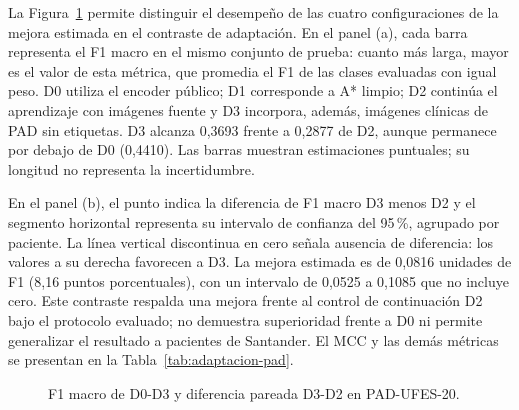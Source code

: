 La Figura~\ref{fig:adaptacion-pad-d0-d3} permite distinguir el desempeño de las cuatro configuraciones de la mejora estimada en el contraste de adaptación. En el panel (a), cada barra representa el F1 macro en el mismo conjunto de prueba: cuanto más larga, mayor es el valor de esta métrica, que promedia el F1 de las clases evaluadas con igual peso. D0 utiliza el encoder público; D1 corresponde a A* limpio; D2 continúa el aprendizaje con imágenes fuente y D3 incorpora, además, imágenes clínicas de PAD sin etiquetas. D3 alcanza 0,3693 frente a 0,2877 de D2, aunque permanece por debajo de D0 (0,4410). Las barras muestran estimaciones puntuales; su longitud no representa la incertidumbre.

En el panel (b), el punto indica la diferencia de F1 macro D3 menos D2 y el segmento horizontal representa su intervalo de confianza del 95\,\%, agrupado por paciente. La línea vertical discontinua en cero señala ausencia de diferencia: los valores a su derecha favorecen a D3. La mejora estimada es de 0,0816 unidades de F1 (8,16 puntos porcentuales), con un intervalo de 0,0525 a 0,1085 que no incluye cero. Este contraste respalda una mejora frente al control de continuación D2 bajo el protocolo evaluado; no demuestra superioridad frente a D0 ni permite generalizar el resultado a pacientes de Santander. El MCC y las demás métricas se presentan en la Tabla~\ref{tab:adaptacion-pad}.

\begin{figure}[!htbp]
\caption{F1 macro de D0-D3 y diferencia pareada D3-D2 en PAD-UFES-20.}
\label{fig:adaptacion-pad-d0-d3}
\centering
\noindent\makebox[\linewidth][c]{}
\par\smallskip
\raggedright\fontsize{11}{13}\selectfont\singlespacing
\par{}
\end{figure}
\FloatBarrier

